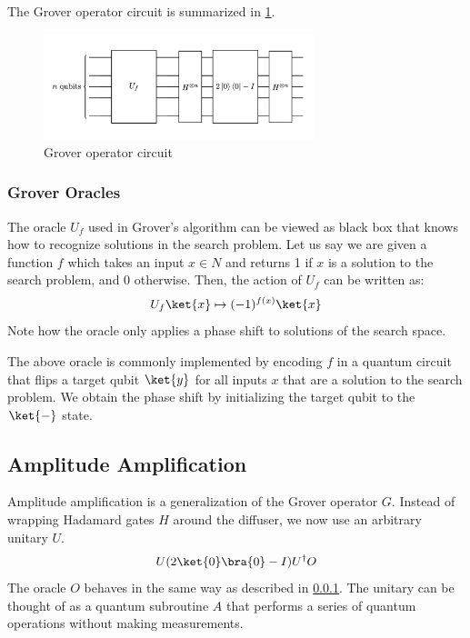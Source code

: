 \documentclass[11pt]{article}
\theoremstyle{definition}
\theoremstyle{remark}
\begin{document}
The Grover operator circuit is summarized in \cref{fig:grover_operator_circuit}.

\begin{figure}[!h]
  \centering
  \includegraphics[width=0.7\textwidth]{../../presentation/assets/grover_operator.png}
  \caption{Grover operator circuit}
  \label{fig:grover_operator_circuit}
\end{figure}

\subsubsection{Grover Oracles} \label{sec:grover_oracles}

The oracle $U_f$ used in Grover’s algorithm can be viewed as black box that
knows how to recognize solutions in the search problem. Let us say we are given
a function $f$ which takes an input $x \in N$ and returns 1 if $x$ is a
solution to the search problem, and 0 otherwise. Then, the action of $U_f$ can
be written as:
\begin{equation}
  U_f\ket{x} \mapsto (-1)^{f(x)}\ket{x}
\end{equation}
Note how the oracle only applies a phase shift to solutions of the search
space. 

The above oracle is commonly implemented by encoding $f$ in a quantum circuit
that flips a target qubit $\ket{y}$ for all inputs $x$ that are a solution to the
search problem. We obtain the phase shift by initializing the target qubit to
the $\ket{-}$ state.

\subsection{Amplitude Amplification} \label{sec:amplitude_amplification}

Amplitude amplification is a generalization of the Grover operator $G$. Instead
of wrapping Hadamard gates $H$ around the diffuser, we now use an arbitrary
unitary $U$.
\begin{equation}
  U(2\ket{0}\bra{0} - I)U^{\dagger}O
\end{equation}
The oracle $O$ behaves in the same way as described in \cref{sec:grover_oracles}.
The unitary can be thought of as a quantum subroutine $A$ that performs a
series of quantum operations without making measurements.
\end{document}
